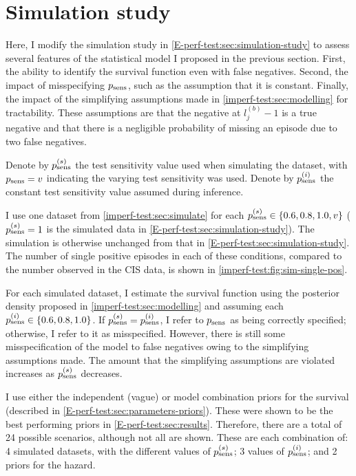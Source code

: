 \documentclass[thesis.tex]{subfiles}
\begin{document}
\section{Simulation study} \label{imperf-test:sec:sim-study-results}

Here, I modify the simulation study in \cref{E-perf-test:sec:simulation-study} to assess several features of the statistical model I proposed in the previous section.
First, the ability to identify the survival function even with false negatives.
Second, the impact of misspecifying $p_\text{sens}$, such as the assumption that it is constant.
Finally, the impact of the simplifying assumptions made in \cref{imperf-test:sec:modelling} for tractability.
These assumptions are that the negative at $l^{(b)}_j - 1$ is a true negative and that there is a negligible probability of missing an episode due to two false negatives.

Denote by $p_\text{sens}^{(s)}$ the test sensitivity value used when simulating the dataset, with $p_\text{sens} = v$ indicating the varying test sensitivity was used.
Denote by $p_\text{sens}^{(i)}$ the constant test sensitivity value assumed during inference.

I use one dataset from \cref{imperf-test:sec:simulate} for each $p_\text{sens}^{(s)} \in \{ 0.6, 0.8, 1.0, v \}$ ($p_\text{sens}^{(s)} = 1$ is the simulated data in \cref{E-perf-test:sec:simulation-study}).
The simulation is otherwise unchanged from that in \cref{E-perf-test:sec:simulation-study}.
The number of single positive episodes in each of these conditions, compared to the number observed in the CIS data, is shown in \cref{imperf-test:fig:sim-single-pos}.

For each simulated dataset, I estimate the survival function using the posterior density proposed in \cref{imperf-test:sec:modelling} and assuming each $p_\text{sens}^{(i)} \in \{0.6, 0.8, 1.0\}$.
If $p_\text{sens}^{(s)} = p_\text{sens}^{(i)}$, I refer to $p_\text{sens}$ as being correctly specified; otherwise, I refer to it as misspecified.
However, there is still some misspecification of the model to false negatives owing to the simplifying assumptions made.
The amount that the simplifying assumptions are violated increases as $p_\text{sens}^{(s)}$ decreases.

I use either the independent (vague) or model combination priors for the survival (described in \cref{E-perf-test:sec:parameters-priors}).
These were shown to be the best performing priors in \cref{E-perf-test:sec:results}.
Therefore, there are a total of 24 possible scenarios, although not all are shown.
These are each combination of: 4 simulated datasets, with the different values of $p_\text{sens}^{(s)}$; 3 values of $p_\text{sens}^{(i)}$; and 2 priors for the hazard.
\end{document}
